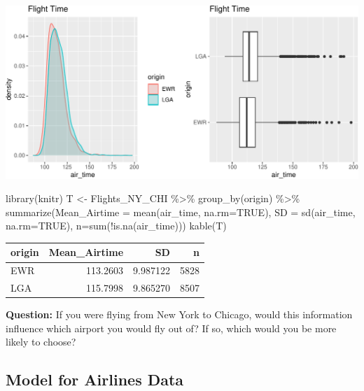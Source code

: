 \documentclass[
  letterpaper,
  DIV=11,
  numbers=noendperiod]{scrreprt}
\newenvironment{Shaded}{\begin{snugshade}}{\end{snugshade}}
\newcommand{\AttributeTok}[1]{\textcolor[rgb]{0.40,0.45,0.13}{#1}}
\newcommand{\ConstantTok}[1]{\textcolor[rgb]{0.56,0.35,0.01}{#1}}
\newcommand{\FunctionTok}[1]{\textcolor[rgb]{0.28,0.35,0.67}{#1}}
\newcommand{\NormalTok}[1]{\textcolor[rgb]{0.00,0.23,0.31}{#1}}
\newcommand{\OtherTok}[1]{\textcolor[rgb]{0.00,0.23,0.31}{#1}}
\newcommand{\SpecialCharTok}[1]{\textcolor[rgb]{0.37,0.37,0.37}{#1}}
\begin{document}
\includegraphics{Ch4_files/figure-pdf/unnamed-chunk-96-1.pdf}

\begin{Shaded}
\begin{Highlighting}[]
\FunctionTok{library}\NormalTok{(knitr)}
\NormalTok{T }\OtherTok{\textless{}{-}}\NormalTok{ Flights\_NY\_CHI }\SpecialCharTok{\%\textgreater{}\%} \FunctionTok{group\_by}\NormalTok{(origin) }\SpecialCharTok{\%\textgreater{}\%} 
  \FunctionTok{summarize}\NormalTok{(}\AttributeTok{Mean\_Airtime =} \FunctionTok{mean}\NormalTok{(air\_time, }\AttributeTok{na.rm=}\ConstantTok{TRUE}\NormalTok{), }
            \AttributeTok{SD =} \FunctionTok{sd}\NormalTok{(air\_time, }\AttributeTok{na.rm=}\ConstantTok{TRUE}\NormalTok{), }\AttributeTok{n=}\FunctionTok{sum}\NormalTok{(}\SpecialCharTok{!}\FunctionTok{is.na}\NormalTok{(air\_time)))}
\FunctionTok{kable}\NormalTok{(T)}
\end{Highlighting}
\end{Shaded}

\begin{longtable}[]{@{}lrrr@{}}
\toprule\noalign{}
origin & Mean\_Airtime & SD & n \\
\midrule\noalign{}
\endhead
\bottomrule\noalign{}
\endlastfoot
EWR & 113.2603 & 9.987122 & 5828 \\
LGA & 115.7998 & 9.865270 & 8507 \\
\end{longtable}

\textbf{Question:} If you were flying from New York to Chicago, would
this information influence which airport you would fly out of? If so,
which would you be more likely to choose?

\subsection{Model for Airlines Data}\label{model-for-airlines-data}
\end{document}
